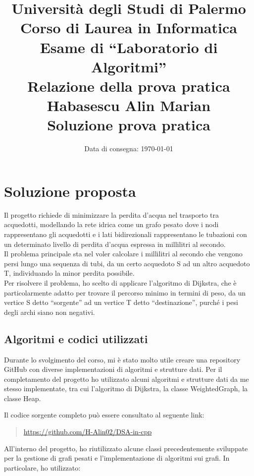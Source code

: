 \documentclass[a4paper,12pt]{article}
\title{
    \vspace{-2cm} %
    \textbf{\Large Università degli Studi di Palermo} \\
    \vspace{0.3cm}
    \textbf{\Large Corso di Laurea in Informatica} \\
    \vspace{1cm}
    \textbf{\Large Esame di ``Laboratorio di Algoritmi''} \\
    \vspace{0.5cm}
    \textbf{\Large Relazione della prova pratica} \\
    \vspace{2cm}
    \textbf{Habasescu Alin Marian} \\
    \vspace{0.5cm}
    \textbf{\Large Soluzione prova pratica} \\
    \vspace{1cm}
}
\date{\normalsize Data di consegna: \today} %
\begin{document}
\maketitle %

\tableofcontents %
\clearpage

\section{Soluzione proposta}
Il progetto richiede di minimizzare la perdita d'acqua nel trasporto tra acquedotti, 
modellando la rete idrica come un grafo pesato dove i nodi rappresentano gli acquedotti 
e i lati bidirezionali rappresentano le tubazioni con un determinato livello di perdita 
d'acqua espressa in millilitri al secondo. \\

Il problema principale sta nel voler calcolare i millilitri al secondo che vengono persi 
lungo una sequenza di tubi, da un certo acquedoto S ad un
altro acquedoto T, individuando la minor perdita possibile.\\

Per risolvere il problema, ho scelto di applicare l'algoritmo di Dijkstra, 
che è particolarmente adatto per trovare il percorso minimo in termini di peso,
da un vertice S detto ``sorgente'' ad un vertice T detto ``destinazione'', 
purché i pesi degli archi siano non negativi.\\

\subsection{Algoritmi e codici utilizzati}
Durante lo svolgimento del corso, mi è stato molto utile creare una repository GitHub
con diverse implementazioni di algoritmi e strutture dati. 
Per il completamento del progetto ho utilizzato alcuni algoritmi e strutture dati
da me stesso implementate, tra cui l'algoritmo di Dijkstra, la classe WeightedGraph,
la classe Heap.

Il codice sorgente completo può essere consultato al seguente link:

\begin{quote}
    \url{https://github.com/H-Alin02/DSA-in-cpp}
\end{quote}

All'interno del progetto, ho riutilizzato alcune classi precedentemente sviluppate 
per la gestione di grafi pesati e l'implementazione di algoritmi sui grafi. 
In particolare, ho utilizzato:
\end{document}

